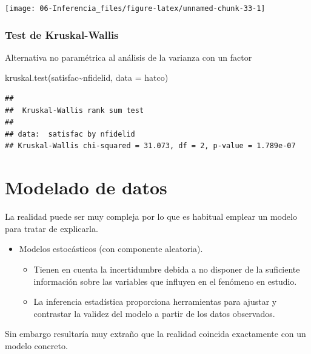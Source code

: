 \documentclass[
]{book}
\newenvironment{Shaded}{\begin{snugshade}}{\end{snugshade}}
\newcommand{\AttributeTok}[1]{\textcolor[rgb]{0.77,0.63,0.00}{#1}}
\newcommand{\FunctionTok}[1]{\textcolor[rgb]{0.00,0.00,0.00}{#1}}
\newcommand{\NormalTok}[1]{#1}
\newcommand{\SpecialCharTok}[1]{\textcolor[rgb]{0.00,0.00,0.00}{#1}}
\theoremstyle{break}
\theoremstyle{nonumberplain}
\begin{document}
\begin{center}\texttt{[image: 06-Inferencia\_files/figure-latex/unnamed-chunk-33-1]} \end{center}

\hypertarget{test-de-kruskal-wallis}{%
\subsection{Test de Kruskal-Wallis}\label{test-de-kruskal-wallis}}

Alternativa no paramétrica al análisis de la varianza con un factor

\begin{Shaded}
\begin{Highlighting}[]
\FunctionTok{kruskal.test}\NormalTok{(satisfac}\SpecialCharTok{\textasciitilde{}}\NormalTok{nfidelid, }\AttributeTok{data =}\NormalTok{ hatco)}
\end{Highlighting}
\end{Shaded}

\begin{verbatim}
## 
##  Kruskal-Wallis rank sum test
## 
## data:  satisfac by nfidelid
## Kruskal-Wallis chi-squared = 31.073, df = 2, p-value = 1.789e-07
\end{verbatim}

\hypertarget{modelado-de-datos}{%
\chapter{Modelado de datos}\label{modelado-de-datos}}

La realidad puede ser muy compleja por lo que es habitual emplear un
modelo para tratar de explicarla.

\begin{itemize}
\item
  Modelos estocásticos (con componente aleatoria).

  \begin{itemize}
  \item
    Tienen en cuenta la incertidumbre debida a no disponer de la suficiente información
    sobre las variables que influyen en el fenómeno en estudio.
  \item
    La inferencia estadística proporciona herramientas para ajustar y
    contrastar la validez del modelo a partir de los datos observados.
  \end{itemize}
\end{itemize}

Sin embargo resultaría muy extraño que la realidad coincida exactamente con un modelo concreto.
\end{document}
